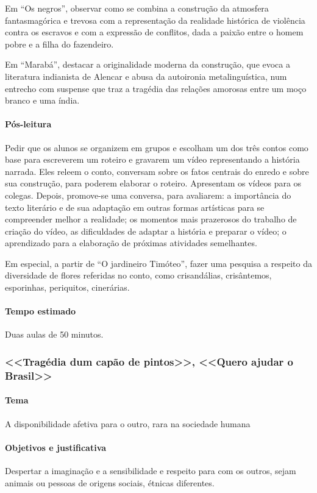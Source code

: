 \documentclass[11pt]{extarticle}
\begin{document}
Em ``Os negros'', observar como se combina a construção da atmosfera
fantasmagórica e trevosa com a representação da realidade histórica de
violência contra os escravos e com a expressão de conflitos, dada a
paixão entre o homem pobre e a filha do fazendeiro.

Em ``Marabá'', destacar a originalidade moderna da construção, que evoca
a literatura indianista de Alencar e abusa da autoironia
metalinguística, num entrecho com suspense que traz a tragédia das
relações amorosas entre um moço branco e uma índia.

\asterisc\paragraph{Pós-leitura}

Pedir que os alunos se organizem em grupos e escolham um dos três contos
como base para escreverem um roteiro e gravarem um vídeo representando a
história narrada. Eles releem o conto, conversam sobre os fatos centrais
do enredo e sobre sua construção, para poderem elaborar o roteiro.
Apresentam os vídeos para os colegas. Depois, promove-se uma conversa,
para avaliarem: a importância do texto literário e de sua adaptação em
outras formas artísticas para se compreender melhor a realidade; os
momentos mais prazerosos do trabalho de criação do vídeo, as
dificuldades de adaptar a história e preparar o vídeo; o aprendizado
para a elaboração de próximas atividades semelhantes.

Em especial, a partir de ``O jardineiro Timóteo'', fazer uma pesquisa a
respeito da diversidade de flores referidas no conto, como crisandálias,
crisântemos, esporinhas, periquitos, cinerárias.

\paragraph{Tempo estimado} Duas aulas de 50 minutos.


\subsubsection{<<Tragédia dum capão de pintos>>, <<Quero ajudar o Brasil>>}

\paragraph{Tema} A disponibilidade afetiva para o outro, rara na sociedade humana


\paragraph{Objetivos e justificativa}
Despertar a imaginação e a sensibilidade e respeito para com os outros,
sejam animais ou pessoas de origens sociais, étnicas diferentes.
\end{document}
